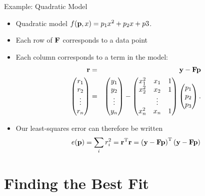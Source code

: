 \documentclass{beamer}
\begin{document}
\begin{frame}{Example: Quadratic Model}
  \begin{itemize}
    \item Quadratic model $f(\mathbf{p},x)= p_1x^2+p_2x+p3$.
    \item Each row of $\mathbf{F}$ corresponds to a data point
    \item Each column corresponds to a term in the model:
      \begin{eqnarray*}
        \mathbf{r}&=&\mathbf{y}-\mathbf{F}\mathbf{p} \\
        \begin{pmatrix}
          r_1 \\ r_2 \\ \vdots \\ r_n
        \end{pmatrix}
        & = &
        \begin{pmatrix}
          y_1 \\ y_2 \\ \vdots \\ y_n
        \end{pmatrix}
        -
        \begin{pmatrix}
          x_1^2 & x_1 & 1 \\
          x_2^2 & x_2 & 1 \\
          &\vdots &\\
          x_n^2 & x_n & 1 \\
        \end{pmatrix}
        \begin{pmatrix}
          p_1 \\ p_2 \\ p_3
        \end{pmatrix}.
      \end{eqnarray*}

    \item Our least-squares error can therefore be written
      \begin{equation}
        e(\mathbf{p}) = \sum_i r_i^2=\mathbf{r}^{\mathrm{T}}\mathbf{r}  = \left(\mathbf{y}-\mathbf{F}\mathbf{p}\right)^{\mathrm{T}} \left(\mathbf{y}-\mathbf{F}\mathbf{p}\right)
      \end{equation}
  \end{itemize}
\end{frame}

\section{Finding the Best Fit}
\end{document}
